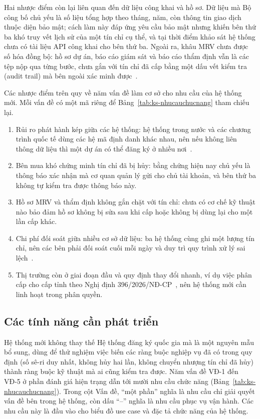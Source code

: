 Hai nhược điểm còn lại liên quan đến dữ liệu công khai và hồ sơ. Dữ liệu mà Bộ công bố chủ yếu là số liệu tổng hợp theo tháng, năm, còn thông tin giao dịch thuộc diện bảo mật; cách làm này đáp ứng yêu cầu bảo mật nhưng khiến bên thứ ba khó truy vết lịch sử của một tín chỉ cụ thể, và tại thời điểm khảo sát hệ thống chưa có tài liệu API công khai cho bên thứ ba. Ngoài ra, khâu MRV chưa được số hóa đồng bộ: hồ sơ dự án, báo cáo giám sát và báo cáo thẩm định vẫn là các tệp nộp qua từng bước, chưa gắn với tín chỉ đã cấp bằng một dấu vết kiểm tra (audit trail) mà bên ngoài xác minh được~\cite{mae2026tthc1014133}.

Các nhược điểm trên quy về năm vấn đề làm cơ sở cho nhu cầu của hệ thống mới. Mỗi vấn đề có một mã riêng để Bảng~\ref{tab:ks-nhucauchucnang} tham chiếu lại.
\begin{enumerate}[label=VĐ-\arabic*., leftmargin=1.6cm]
    \item Rủi ro phát hành kép giữa các hệ thống: hệ thống trong nước và các chương trình quốc tế dùng các hệ mã định danh khác nhau, nên nếu không liên thông dữ liệu thì một dự án có thể đăng ký ở nhiều nơi~\cite{schneider2019double}.
    \item Bên mua khó chứng minh tín chỉ đã bị hủy: bằng chứng hiện nay chủ yếu là thông báo xác nhận mà cơ quan quản lý gửi cho chủ tài khoản, và bên thứ ba không tự kiểm tra được thông báo này.
    \item Hồ sơ MRV và thẩm định không gắn chặt với tín chỉ: chưa có cơ chế kỹ thuật nào bảo đảm hồ sơ không bị sửa sau khi cấp hoặc không bị dùng lại cho một lần cấp khác.
    \item Chi phí đối soát giữa nhiều cơ sở dữ liệu: ba hệ thống cùng ghi một lượng tín chỉ, nên các bên phải đối soát cuối mỗi ngày và duy trì quy trình xử lý sai lệch~\cite{vietnam2026thongtu11}.
    \item Thị trường còn ở giai đoạn đầu và quy định thay đổi nhanh, ví dụ việc phân cấp cho cấp tỉnh theo Nghị định 396/2026/NĐ-CP~\cite{vietnam2026nghidinh396}, nên hệ thống mới cần linh hoạt trong phân quyền.
\end{enumerate}

\FloatBarrier
\subsection*{Các tính năng cần phát triển}
\label{subsec:ks-nhucau}

Hệ thống mới không thay thế Hệ thống đăng ký quốc gia mà là một nguyên mẫu bổ sung, dùng để thử nghiệm việc biến các ràng buộc nghiệp vụ đã có trong quy định (số sê-ri duy nhất, không hủy hai lần, không chuyển nhượng tín chỉ đã hủy) thành ràng buộc kỹ thuật mà ai cũng kiểm tra được. Năm vấn đề VĐ-1 đến VĐ-5 ở phần đánh giá hiện trạng dẫn tới mười nhu cầu chức năng (Bảng~\ref{tab:ks-nhucauchucnang}). Trong cột Vấn đề, ``một phần'' nghĩa là nhu cầu chỉ giải quyết vấn đề bên trong hệ thống, còn dấu ``--'' nghĩa là nhu cầu phục vụ vận hành. Các nhu cầu này là đầu vào cho biểu đồ use case và đặc tả chức năng của hệ thống.

